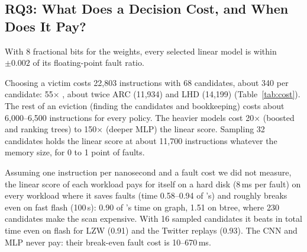 \subsection{RQ3: What Does a Decision Cost, and When Does It Pay?}
\label{sec:eval-cost}

\begin{table}[t]
\caption{Instructions the kernel spends choosing one victim among 68 candidates, counted
exactly (QEMU instruction-counting mode, repeatable to 0.3\%), and as a multiple of the
linear score.}
\label{tab:cost}
\vskip 0.1in
\begin{center}
\resizebox{\linewidth}{!}{}
\end{center}
\vskip -0.1in
\end{table}

 With 8 fractional bits for the weights, every
selected linear model is within $\pm0.002$ of its floating-point fault ratio.

 Choosing a victim
costs 22,803 instructions with 68 candidates, about 340 per candidate: 55$\times$ \clock,
about twice ARC (11,934) and LHD (14,199) (Table~\ref{tab:cost}). The rest of an
eviction (finding the candidates and bookkeeping) costs about 6,000--6,500 instructions
for every policy. The heavier models cost 20$\times$ (boosted and ranking trees) to
150$\times$ (deeper MLP) the linear score. Sampling 32 candidates holds the linear score
at about 11,700 instructions whatever the memory size, for 0 to 1 point of faults.

 Assuming one instruction per
nanosecond and a fault cost we did not measure, the linear score of each workload pays
for itself on a hard disk (8\,ms per fault) on every workload where it saves faults (time
0.58--0.94 of \clock's) and roughly breaks even on fast flash (100\,\textmu s): 0.90 of
\clock's time on graph, 1.51 on btree, where 230 candidates make the scan expensive.
With 16 sampled candidates it beats \clock in total time even on flash for LZW (0.91)
and the Twitter replays (0.93). The CNN and MLP never pay: their break-even fault cost is
10--670\,ms.

